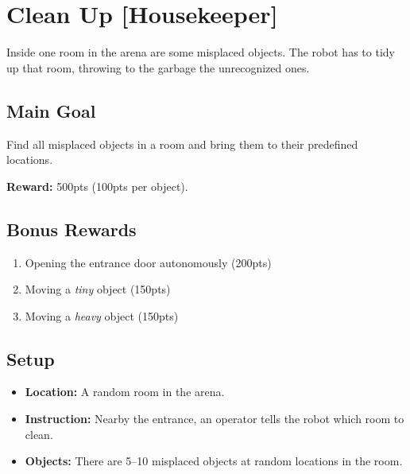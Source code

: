 \section{Clean Up [Housekeeper]}
\label{test:clean-up}
Inside one room in the arena are some misplaced objects. The robot has to tidy up that room, throwing to the garbage the unrecognized ones.


\subsection*{Main Goal}
Find all misplaced objects in a room and bring them to their predefined locations.

\noindent\textbf{Reward:} 500pts (100pts per object).

\subsection*{Bonus Rewards}
\begin{enumerate}[nosep]
	\item Opening the entrance door autonomously (200pts)
	\item Moving a \emph{tiny} object (150pts)
	\item Moving a \emph{heavy} object (150pts)
\end{enumerate}


\subsection*{Setup}
\begin{itemize}[nosep]
	\item \textbf{Location:} A random room in the arena.
	\item \textbf{Instruction:} Nearby the entrance, an operator tells the robot which room to clean.
	\item \textbf{Objects:} There are 5--10 misplaced objects at random locations in the room.
\end{itemize}

